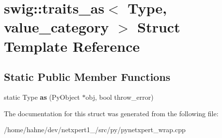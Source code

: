 \hypertarget{structswig_1_1traits__as_3_01Type_00_01value__category_01_4}{}\section{swig\+:\+:traits\+\_\+as$<$ Type, value\+\_\+category $>$ Struct Template Reference}
\label{structswig_1_1traits__as_3_01Type_00_01value__category_01_4}
\subsection*{Static Public Member Functions}
\begin{DoxyCompactItemize}
\item 
static Type {\bfseries as} (Py\+Object $\ast$obj, bool throw\+\_\+error)\hypertarget{structswig_1_1traits__as_3_01Type_00_01value__category_01_4_addd7e404759a0808fa9f342f7a0f887b}{}\label{structswig_1_1traits__as_3_01Type_00_01value__category_01_4_addd7e404759a0808fa9f342f7a0f887b}

\end{DoxyCompactItemize}


The documentation for this struct was generated from the following file\+:\begin{DoxyCompactItemize}
\item 
/home/hahne/dev/netxpert1\+\_/src/py/pynetxpert\+\_\+wrap.\+cpp\end{DoxyCompactItemize}
